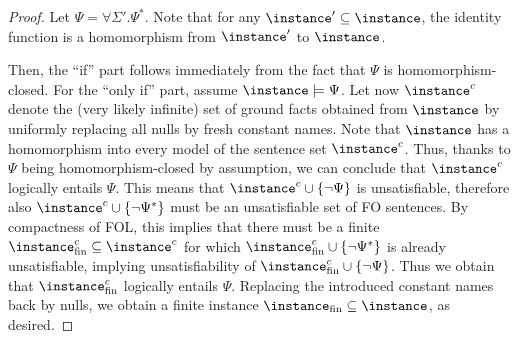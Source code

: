 \begin{proof}
Let $\Psi = \forall \Sigma'.\Psi^*$. 
Note that for any $\instance' \subseteq \instance$, the identity function is a homomorphism from $\instance'$ to $\instance$.

Then, the ``if'' part follows immediately from the fact that $\Psi$ is homomorphism-closed. For the ``only if'' part, assume $\instance \models \Psi$. Let now $\instance^c$ denote the (very likely infinite) set of ground facts obtained from $\instance$ by uniformly replacing all nulls by fresh constant names. Note that $\instance$ has a homomorphism into every model of the sentence set $\instance^c$. Thus, thanks to $\Psi$ being homomorphism-closed by assumption, we can conclude that $\instance^c$ logically entails $\Psi$.
This means that $\instance^c \cup \{\neg\Psi\}$ is unsatisfiable, therefore also $\instance^c \cup \{\neg\Psi^*\}$ must be an unsatisfiable set of FO sentences. By compactness of FOL, this implies that there must be a finite $\instance^c_\mathrm{fin} \subseteq \instance^c$ for which $\instance^c_\mathrm{fin} \cup \{\neg\Psi^*\}$ is already unsatisfiable, implying unsatisfiability of $\instance^c_\mathrm{fin} \cup \{\neg\Psi\}$. Thus we obtain that  
$\instance^c_\mathrm{fin}$ logically entails $\Psi$. Replacing the introduced constant names back by nulls, we obtain a finite instance $\instance_\mathrm{fin} \subseteq \instance$, as desired.
\end{proof}



